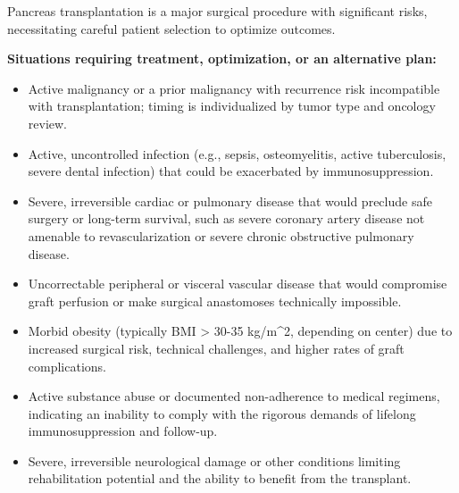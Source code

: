 Pancreas transplantation is a major surgical procedure with significant risks, necessitating careful patient selection to optimize outcomes.

\textbf{Situations requiring treatment, optimization, or an alternative plan:}
\begin{itemize}
  \item Active malignancy or a prior malignancy with recurrence risk incompatible with transplantation; timing is individualized by tumor type and oncology review.
  \item Active, uncontrolled infection (e.g., sepsis, osteomyelitis, active tuberculosis, severe dental infection) that could be exacerbated by immunosuppression.
  \item Severe, irreversible cardiac or pulmonary disease that would preclude safe surgery or long-term survival, such as severe coronary artery disease not amenable to revascularization or severe chronic obstructive pulmonary disease.
  \item Uncorrectable peripheral or visceral vascular disease that would compromise graft perfusion or make surgical anastomoses technically impossible.
  \item Morbid obesity (typically BMI > 30-35 kg/m\textasciicircum2, depending on center) due to increased surgical risk, technical challenges, and higher rates of graft complications.
  \item Active substance abuse or documented non-adherence to medical regimens, indicating an inability to comply with the rigorous demands of lifelong immunosuppression and follow-up.
  \item Severe, irreversible neurological damage or other conditions limiting rehabilitation potential and the ability to benefit from the transplant.
\end{itemize}


